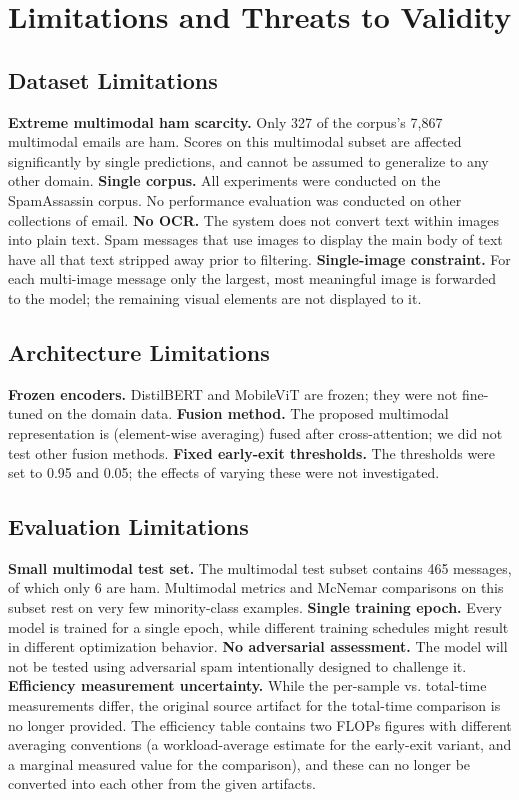 \documentclass[10pt,twoside]{article}
\begin{document}
\section{Limitations and Threats to Validity}\label{sec:9}

\subsection{Dataset Limitations}\label{sec:9.1}

\textbf{Extreme multimodal ham scarcity.} Only 327 of the corpus's 7,867 multimodal emails are ham. Scores on this multimodal subset are affected significantly by single predictions, and cannot be assumed to generalize to any other domain. \textbf{Single corpus.} All experiments were conducted on the SpamAssassin corpus. No performance evaluation was conducted on other collections of email. \textbf{No OCR.} The system does not convert text within images into plain text. Spam messages that use images to display the main body of text have all that text stripped away prior to filtering. \textbf{Single-image constraint.} For each multi-image message only the largest, most meaningful image is forwarded to the model; the remaining visual elements are not displayed to it.

\subsection{Architecture Limitations}\label{sec:9.2}

\textbf{Frozen encoders.} DistilBERT and MobileViT are frozen; they were not fine-tuned on the domain data. \textbf{Fusion method.} The proposed multimodal representation is (element-wise averaging) fused after cross-attention; we did not test other fusion methods. \textbf{Fixed early-exit thresholds.} The thresholds were set to 0.95 and 0.05; the effects of varying these were not investigated.

\subsection{Evaluation Limitations}\label{sec:9.3}

\textbf{Small multimodal test set.} The multimodal test subset contains 465 messages, of which only 6 are ham. Multimodal metrics and McNemar comparisons on this subset rest on very few minority-class examples. \textbf{Single training epoch.} Every model is trained for a single epoch, while different training schedules might result in different optimization behavior. \textbf{No adversarial assessment.} The model will not be tested using adversarial spam intentionally designed to challenge it. \textbf{Efficiency measurement uncertainty.} While the per-sample vs. total-time measurements differ, the original source artifact for the total-time comparison is no longer provided. The efficiency table contains two FLOPs figures with different averaging conventions (a workload-average estimate for the early-exit variant, and a marginal measured value for the comparison), and these can no longer be converted into each other from the given artifacts.
\end{document}
